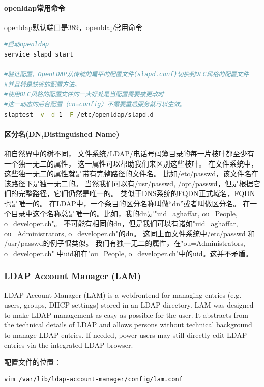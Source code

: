 \documentclass{book}
\begin{document}
\paragraph{openldap常用命令}openldap默认端口是389，openldap常用命令

\begin{lstlisting}[language=Bash]
#启动openldap
service slapd start

#验证配置，OpenLDAP从传统的扁平的配置文件(slapd.conf)切换到OLC风格的配置文件
#并且将是缺省的配置方法。
#使用OLC风格的配置文件的一大好处是当配置需要被更改时
#这一动态的后台配置（cn=config）不需要重启服务就可以生效。
slaptest -v -d 1 -F /etc/openldap/slapd.d
\end{lstlisting}

\paragraph{区分名(DN,Distinguished Name)}和自然界中的树不同，
文件系统/LDAP/电话号码簿目录的每一片枝叶都至少有一个独一无二的属性，
这一属性可以帮助我们来区别这些枝叶。 
在文件系统中， 这些独一无二的属性就是带有完整路径的文件名。
比如/etc/passwd，该文件名在该路径下是独一无二的。
当然我们可以有/usr/passwd, /opt/passwd，但是根据它们的完整路径，它们仍然是唯一的。 
类似于DNS系统的FQDN正式域名，FQDN也是唯一的。 
在LDAP中，一个条目的区分名称叫做“dn”或者叫做区分名。
在一个目录中这个名称总是唯一的。比如，我的dn是"uid=aghaffar, ou=People, o=developer.ch"。
不可能有相同的dn，但是我们可以有诸如"uid=aghaffar, ou=Administrators, o=developer.ch"的dn。
这同上面文件系统中/etc/passwd 和 /usr/passwd的例子很类似。 
我们有独一无二的属性，在"ou=Administrators, o=developer.ch" 中uid和在"ou=People, o=developer.ch"中的uid。这并不矛盾。 

\subsubsection{LDAP Account Manager (LAM) }

LDAP Account Manager (LAM) is a webfrontend for managing entries (e.g. users, groups, DHCP settings) stored in an LDAP directory. LAM was designed to make LDAP management as easy as possible for the user. It abstracts from the technical details of LDAP and allows persons without technical background to manage LDAP entries. If needed, power users may still directly edit LDAP entries via the integrated LDAP browser.

配置文件的位置：

\begin{lstlisting}[language=Bash]
vim /var/lib/ldap-account-manager/config/lam.conf
\end{lstlisting}
\end{document}
